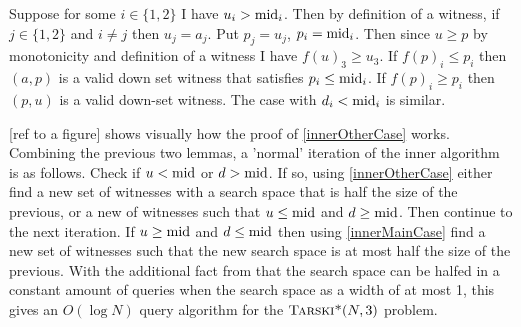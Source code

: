 \begin{sproof}
  Suppose for some $i \in \{1, 2\}$ I have $u_i > \text{mid}_i$. Then
  by definition of a witness, if $j \in \{1, 2\}$ and $i \neq j$ then $u_j = a_j$.
  Put $p_j = u_j$, $p_i = \text{mid}_i$. Then since $u \geq p$ by monotonicity
  and definition of a witness I have $f(u)_3 \geq u_3$. If $f(p)_i \leq p_i$ then
  $(a, p)$ is a valid down set witness that satisfies $p_i \leq \text{mid}_i$. If
  $f(p)_i \geq p_i$ then $(p, u)$ is a valid down-set witness.
  The case with $d_i < \text{mid}_i$ is similar.
\end{sproof}
[ref to a figure] shows visually how the proof of \cref{innerOtherCase} works. Combining
the previous two lemmas, a 'normal' iteration of the inner algorithm is as follows.
Check if $u < \text{mid}$ or $d > \text{mid}$. If so, using \cref{innerOtherCase} either find a new
set of witnesses with a search space that is half the size of the previous, or a new of
witnesses such that $u \leq \text{mid}$ and $d \geq \text{mid}$. Then continue to the next iteration.
If $u \geq \text{mid}$ and $d \leq \text{mid}$ then using \cref{innerMainCase} find a new set of witnesses
such that the new search space is at most half the size of the previous.
With the additional fact from \citep{fasterTarski} that the search space can be halfed in a constant amount of
queries when the search space as a width of at most 1, this gives an $O(\log N)$ query algorithm
for the $\textsc{Tarski*}(N, 3)$ problem.

